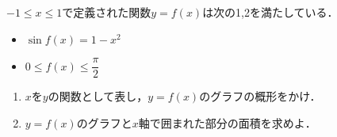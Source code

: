 \documentclass[../../main.tex]{subfiles}
\begin{document}
$-1\le x\le 1$で定義された関数$y=f(x)$は次の1,2を満たしている．
\begin{itemize}
  \item[1] $\sin f(x) = 1-x^2$
  \item[2] $0\le f(x)\le \dfrac{\pi}{2}$
\end{itemize}
\begin{enumerate}
  \item $x$を$y$の関数として表し，$y=f(x)$のグラフの概形をかけ．
  \item $y=f(x)$のグラフと$x$軸で囲まれた部分の面積を求めよ．
\end{enumerate}
\end{document}
